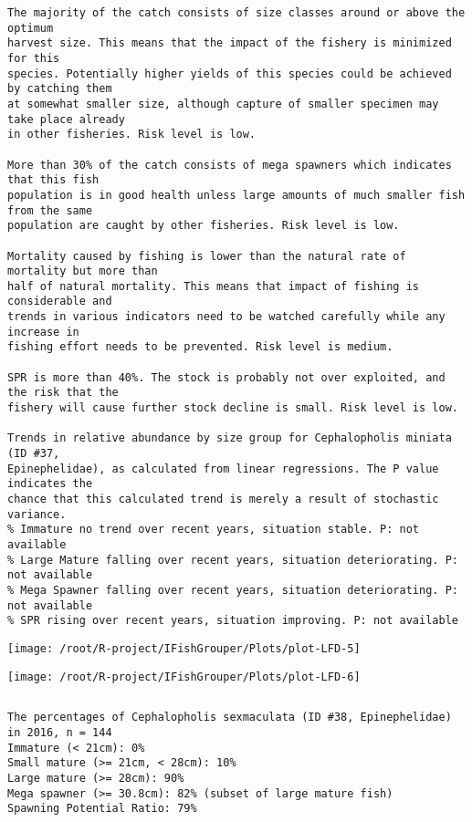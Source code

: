 \documentclass{report}\usepackage[]{graphicx}\usepackage[]{color}
\makeatletter
\def\maxwidth{ %
  \ifdim\Gin@nat@width>\linewidth
    \linewidth
  \else
    \Gin@nat@width
  \fi
}
\newenvironment{kframe}{%
 \def\at@end@of@kframe{}%
 \ifinner\ifhmode%
  \def\at@end@of@kframe{\end{minipage}}%
  \begin{minipage}{\columnwidth}%
 \fi\fi%
 \def\FrameCommand##1{\hskip\@totalleftmargin \hskip-\fboxsep
 \colorbox{shadecolor}{##1}\hskip-\fboxsep
     \hskip-\linewidth \hskip-\@totalleftmargin \hskip\columnwidth}%
 \MakeFramed {\advance\hsize-\width
   \@totalleftmargin\z@ \linewidth\hsize
   \@setminipage}}%
 {\par\unskip\endMakeFramed%
 \at@end@of@kframe}
\newenvironment{knitrout}{}{} %
\makeatother
\begin{document}
\begin{knitrout}
\begin{kframe}
\begin{verbatim}
The majority of the catch consists of size classes around or above the optimum
harvest size. This means that the impact of the fishery is minimized for this
species. Potentially higher yields of this species could be achieved by catching them
at somewhat smaller size, although capture of smaller specimen may take place already
in other fisheries. Risk level is low.

More than 30% of the catch consists of mega spawners which indicates that this fish
population is in good health unless large amounts of much smaller fish from the same
population are caught by other fisheries. Risk level is low.
 
Mortality caused by fishing is lower than the natural rate of mortality but more than
half of natural mortality. This means that impact of fishing is considerable and
trends in various indicators need to be watched carefully while any increase in
fishing effort needs to be prevented. Risk level is medium.
 
SPR is more than 40%. The stock is probably not over exploited, and the risk that the
fishery will cause further stock decline is small. Risk level is low.
 
Trends in relative abundance by size group for Cephalopholis miniata (ID #37,
Epinephelidae), as calculated from linear regressions. The P value indicates the
chance that this calculated trend is merely a result of stochastic variance.
% Immature no trend over recent years, situation stable. P: not available
% Large Mature falling over recent years, situation deteriorating. P: not available
% Mega Spawner falling over recent years, situation deteriorating. P: not available
% SPR rising over recent years, situation improving. P: not available
\end{verbatim}
\end{kframe}
\texttt{[image: /root/R-project/IFishGrouper/Plots/plot-LFD-5]} 

\texttt{[image: /root/R-project/IFishGrouper/Plots/plot-LFD-6]} 
\begin{kframe}\begin{verbatim}
\end{verbatim}
\end{kframe}
\clearpage
\newpage
\begin{kframe}\begin{verbatim}The percentages of Cephalopholis sexmaculata (ID #38, Epinephelidae) in 2016, n = 144
Immature (< 21cm): 0%
Small mature (>= 21cm, < 28cm): 10%
Large mature (>= 28cm): 90%
Mega spawner (>= 30.8cm): 82% (subset of large mature fish)
Spawning Potential Ratio: 79%
 

\end{verbatim}
\end{kframe}
\end{knitrout}
\end{document}
